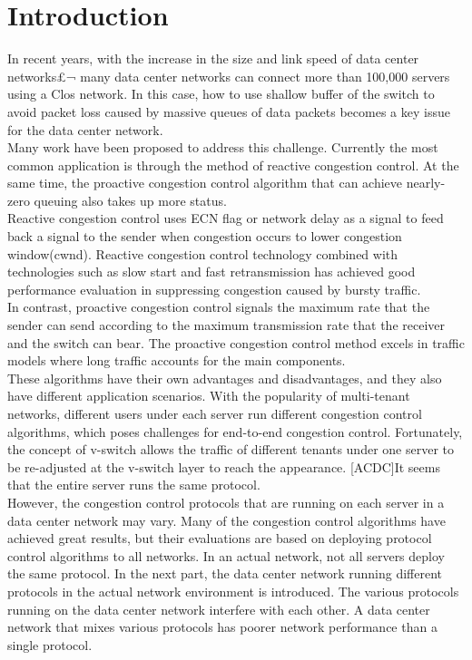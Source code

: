 \documentclass[conference]{IEEEtran}
\begin{document}
\section{Introduction}
In recent years, with the increase in the size and link speed of data center networks£¬ many data center networks can connect more than 100,000 servers using a Clos network. In this case, how to use shallow buffer of the switch to avoid packet loss caused by massive queues of data packets becomes a key issue for the data center network.\\
\indent Many work have been proposed to address this challenge. Currently the most common application is through the method of reactive congestion control. At the same time, the proactive congestion control algorithm that can achieve nearly-zero queuing also takes up more status.\\
\indent Reactive congestion control uses ECN flag or network delay as a signal to feed back a signal to the sender when congestion occurs to lower congestion window(cwnd). Reactive congestion control technology combined with technologies such as slow start and fast retransmission has achieved good performance evaluation in suppressing congestion caused by bursty traffic.\\
\indent In contrast, proactive congestion control signals the maximum rate that the sender can send according to the maximum transmission rate that the receiver and the switch can bear. The proactive congestion control method excels in traffic models where long traffic accounts for the main components.\\
\indent These algorithms have their own advantages and disadvantages, and they also have different application scenarios. With the popularity of multi-tenant networks, different users under each server run different congestion control algorithms, which poses challenges for end-to-end congestion control. Fortunately, the concept of v-switch allows the traffic of different tenants under one server to be re-adjusted at the v-switch layer to reach the appearance. [ACDC]It seems that the entire server runs the same protocol.\\
\indent However, the congestion control protocols that are running on each server in a data center network may vary. Many of the congestion control algorithms have achieved great results, but their evaluations are based on deploying protocol control algorithms to all networks. In an actual network, not all servers deploy the same protocol. In the next part, the data center network running different protocols in the actual network environment is introduced. The various protocols running on the data center network interfere with each other. A data center network that mixes various protocols has poorer network performance than a single protocol.\\
\end{document}
